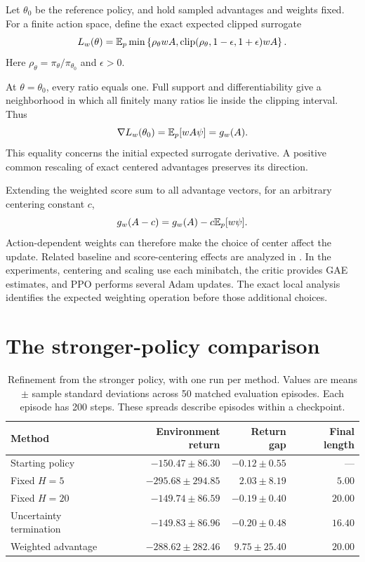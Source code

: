 Let $\theta_0$ be the reference policy, and hold sampled advantages and weights fixed. For a finite action space, define the exact expected clipped surrogate
\[
L_w(\theta)=\mathbb{E}_{p}\min\left\{\rho_\theta wA,\operatorname{clip}(\rho_\theta,1-\epsilon,1+\epsilon)wA\right\}.
\]
Here $\rho_\theta=\pi_\theta/\pi_{\theta_0}$ and $\epsilon>0$.

At $\theta=\theta_0$, every ratio equals one. Full support and differentiability give a neighborhood in which all finitely many ratios lie inside the clipping interval. Thus
\begin{equation}
\nabla L_w(\theta_0)=\mathbb{E}_p[wA\psi]=g_w(A).
\end{equation}
This equality concerns the initial expected surrogate derivative. A positive common rescaling of exact centered advantages preserves its direction.

Extending the weighted score sum to all advantage vectors, for an arbitrary centering constant $c$,
\begin{equation}
g_w(A-c)=g_w(A)-c\mathbb{E}_p[w\psi].
\label{eq:weighted-baseline}
\end{equation}
Action-dependent weights can therefore make the choice of center affect the update. Related baseline and score-centering effects are analyzed in \cite{tucker,han}. In the experiments, centering and scaling use each minibatch, the critic provides GAE estimates, and PPO performs several Adam updates. The exact local analysis identifies the expected weighting operation before those additional choices.

\section{The stronger-policy comparison}
\label{app:strong-policy}

\begin{table}[htbp]
\centering
\small
\caption{Refinement from the stronger policy, with one run per method. Values are means $\pm$ sample standard deviations across 50 matched evaluation episodes. Each episode has 200 steps. These spreads describe episodes within a checkpoint.}
\label{tab:strong-policy}
\begin{tabular}{lrrr}
\toprule
Method & Environment return & Return gap & Final length\\
\midrule
Starting policy & $-150.47\pm86.30$ & $-0.12\pm0.55$ & ---\\
Fixed $H=5$ & $-295.68\pm294.85$ & $2.03\pm8.19$ & $5.00$\\
Fixed $H=20$ & $-149.74\pm86.59$ & $-0.19\pm0.40$ & $20.00$\\
Uncertainty termination & $-149.83\pm86.96$ & $-0.20\pm0.48$ & $16.40$\\
Weighted advantage & $-288.62\pm282.46$ & $9.75\pm25.40$ & $20.00$\\
\bottomrule
\end{tabular}
\end{table}

